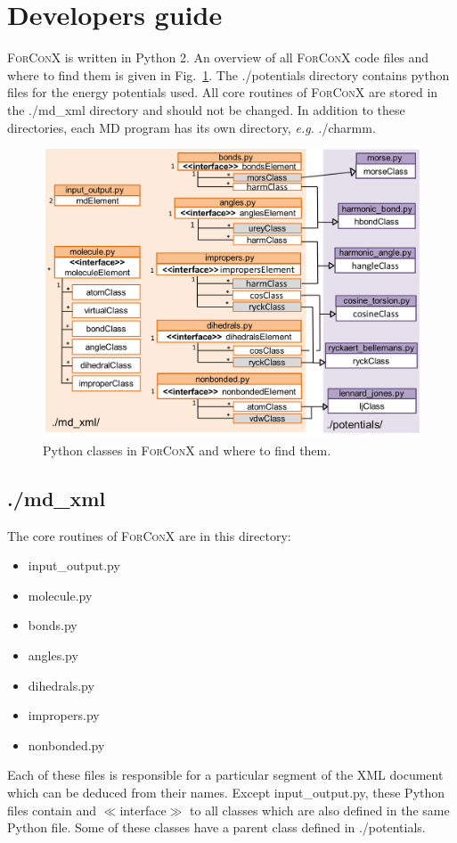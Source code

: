 \documentclass[12pt]{article}
\begin{document}
\clearpage{}
\section{Developers guide}
\textsc{ForConX} is written in Python 2. 
An overview of all \textsc{ForConX} code files and where to find them is given in Fig.~\ref{fig:classes}.
The ./potentials directory contains python files for the energy potentials used. All core routines of \textsc{ForConX} are stored in the ./md\_xml directory and 
should not be changed.
In addition to these directories, each MD program has its own directory, \textit{e.g.} ./charmm. 
\begin{figure}[bh]
\centering
 \includegraphics[width=\linewidth]{ForConX_Classes.png}
 \caption{Python classes in \textsc{ForConX} and where to find them.}
 \label{fig:classes}
\end{figure}

\subsection{./md\_xml}
The core routines of \textsc{ForConX} are in this directory:
\begin{itemize}
 \item input\_output.py
 \item molecule.py
 \item bonds.py
 \item angles.py
 \item dihedrals.py
 \item impropers.py
 \item nonbonded.py
\end{itemize}
Each of these files is responsible for a particular segment of the XML document which can be deduced from their names. Except input\_output.py, these Python files
contain and $\ll$interface$\gg$ to all classes which are also defined in the same Python file. 
Some of these classes have a parent class defined in ./potentials.
\end{document}
